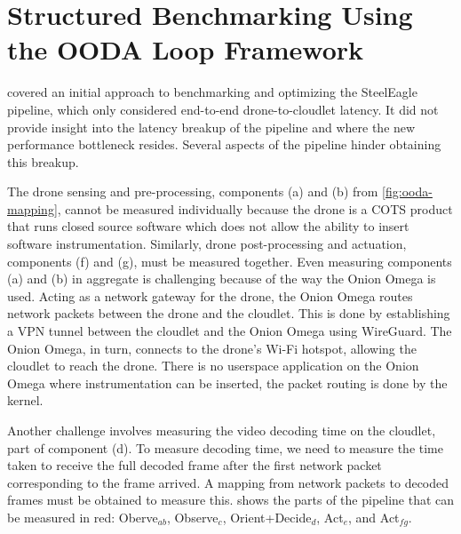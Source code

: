 \section{Structured Benchmarking Using the OODA Loop Framework}
\label{sec:exp2}

 covered an initial approach to benchmarking and optimizing the
SteelEagle pipeline, which only considered end-to-end drone-to-cloudlet
latency. It did not provide insight into the latency breakup of the pipeline
and where the new performance bottleneck resides. Several aspects of the
pipeline hinder obtaining this breakup.

The drone sensing and pre-processing, components (a) and (b) from
\cref{fig:ooda-mapping}, cannot be measured individually because the drone is a
COTS product that runs closed source software which does not allow the ability
to insert software instrumentation.  Similarly, drone post-processing and
actuation, components (f) and (g), must be measured together. Even measuring
components (a) and (b) in aggregate is challenging because of the way the Onion
Omega is used. Acting as a network gateway for the drone, the Onion Omega
routes network packets between the drone and the cloudlet. This is done by
establishing a VPN tunnel between the cloudlet and the Onion Omega using
WireGuard. The Onion Omega, in turn, connects to the drone's Wi-Fi hotspot,
allowing the cloudlet to reach the drone. There is no userspace application on
the Onion Omega where instrumentation can be inserted, the packet routing is
done by the kernel.

Another challenge involves measuring the video decoding time on the cloudlet,
part of component (d).  To measure decoding time, we need to measure the time
taken to receive the full decoded frame after the first network packet
corresponding to the frame arrived. A mapping from network packets to decoded
frames must be obtained to measure this.  shows the
parts of the pipeline that can be measured in red: Oberve$_{ab}$, Observe$_c$,
Orient+Decide$_d$, Act$_e$, and Act$_{fg}$.

